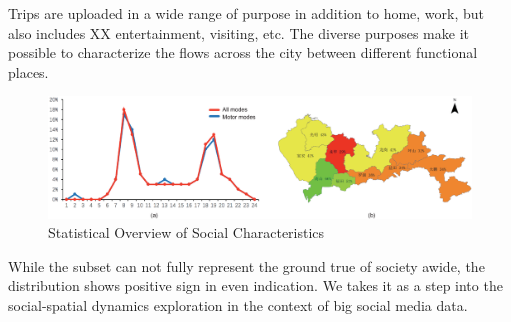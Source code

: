 Trips are uploaded in a wide range of purpose in addition to home, work, but also includes XX entertainment, visiting, etc. The diverse purposes make it possible to characterize the flows across the city between different functional places. 

\begin{figure}[htb!]
 \centering %
 \includegraphics[width=\columnwidth]{pictures/data3}
 \caption{Statistical Overview of Social Characteristics}
 \label{fig:data_geometry}
\end{figure}

While the subset can not fully represent the ground true of society awide, the distribution shows positive sign in even indication. We takes it as a step into the social-spatial dynamics exploration in the context of big social media data. 
